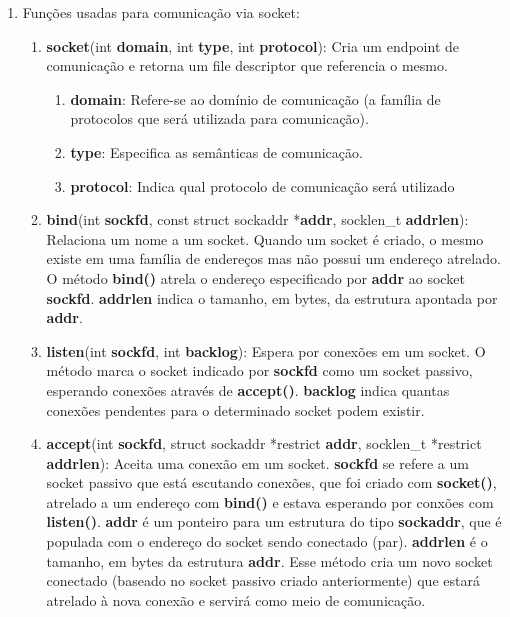 \documentclass[12pt,a4paper]{report}
\begin{document}
\begin{enumerate}
   \item Funções usadas para comunicação via socket:
   \begin{enumerate}
        \item \textbf{socket}(int \textbf{domain}, int \textbf{type}, int \textbf{protocol}): Cria um  endpoint de comunicação e retorna um file descriptor que referencia o mesmo.
       \begin{enumerate}
            \item \textbf{domain}: Refere-se ao domínio de comunicação (a família de protocolos que será utilizada para comunicação).
            
            \item \textbf{type}: Especifica as semânticas de comunicação.
            
            \item \textbf{protocol}: Indica qual protocolo de comunicação será utilizado
        \end{enumerate}
        
        \item \textbf{bind}(int \textbf{sockfd}, const struct sockaddr *\textbf{addr}, socklen\_t \textbf{addrlen}): Relaciona um nome a um socket. Quando um socket é criado, o mesmo existe em uma família de endereços mas não possui um endereço atrelado. O método \textbf{bind()} atrela o endereço especificado por \textbf{addr} ao socket \textbf{sockfd}. \textbf{addrlen} indica o tamanho, em bytes, da estrutura apontada por \textbf{addr}.
        
        \item \textbf{listen}(int \textbf{sockfd}, int \textbf{backlog}): Espera por conexões em um socket. O método marca o socket indicado por \textbf{sockfd} como um socket passivo, esperando conexões através de \textbf{accept()}. \textbf{backlog} indica quantas conexões pendentes para o determinado socket podem existir.
        
        \item \textbf{accept}(int \textbf{sockfd}, struct sockaddr *restrict \textbf{addr}, socklen\_t *restrict \textbf{addrlen}): Aceita uma conexão em um socket. \textbf{sockfd} se refere a um socket passivo que está escutando conexões, que foi criado com \textbf{socket()}, atrelado a um endereço com \textbf{bind()} e estava esperando por conxões com \textbf{listen()}. \textbf{addr} é um ponteiro para um estrutura do tipo \textbf{sockaddr}, que é populada com o endereço do socket sendo conectado (par). \textbf{addrlen} é o tamanho, em bytes da estrutura \textbf{addr}. Esse método cria um novo socket conectado (baseado no socket passivo criado anteriormente) que estará atrelado à nova conexão e servirá como meio de comunicação.
        

\end{enumerate}
\end{enumerate}
\end{document}
